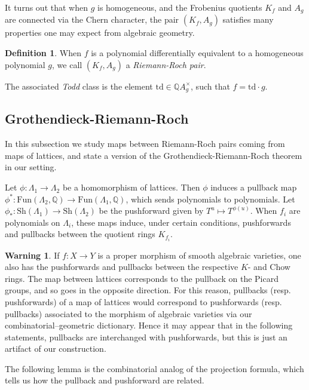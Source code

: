 \documentclass[oneside]{amsart}
\theoremstyle{plain}
\theoremstyle{definition}
\newtheorem{definition}[theorem]{Definition}
\newtheorem*{warning}{Warning}
\newcommand{\Q}{{\mathbb{Q}}}
\newcommand{\Fun}{{\mathrm{Fun}}}
\newcommand{\Sh}{{\mathrm{Sh}}}
\newcommand{\td}{{\mathrm{td}}}
\begin{document}
It turns out that when $g$ is homogeneous, and the Frobenius quotients $K_f$ and $A_g$ are connected via the Chern character, the pair $(K_f, A_g)$ satisfies many properties one may expect from algebraic geometry.

\begin{definition}
\label{def:RR-pair-std-graded}
    When $f$ is a polynomial differentially equivalent to a homogeneous polynomial $g$, we call $(K_f, A_g)$ a \emph{Riemann-Roch pair}.

    The associated \emph{Todd} class is the element $\td \in \Q A_g^\times$, such that $f = \td \cdot g$.
\end{definition}

\subsection{Grothendieck-Riemann-Roch}\label{sec:grr}

In this subsection we study maps between Riemann-Roch pairs coming from maps of lattices, and state a version of the Grothendieck-Riemann-Roch theorem in our setting.

Let $\phi\colon \Lambda_1\to \Lambda_2$ be a homomorphism of lattices. Then $\phi$ induces a pullback map
$\phi^*:\Fun(\Lambda_2, \Q) \to \Fun(\Lambda_1, \Q)$, which sends polynomials to polynomials.
Let $\phi_*: \Sh(\Lambda_1) \to \Sh(\Lambda_2)$ be the pushforward given by $T^u \mapsto T^{\phi(u)}$. 
When $f_i$ are polynomials on $\Lambda_i$, these maps induce, under certain conditions, pushforwards and pullbacks between the quotient rings $K_{f_i}$.

\begin{warning}
    If $f: X \to Y$ is a proper morphism of smooth algebraic varieties, one also has the pushforwards and pullbacks between the respective $K$- and Chow rings. The map between lattices corresponds to the pullback on the Picard groups, and so goes in the opposite direction. For this reason, pullbacks (resp. pushforwards) of a map of lattices would correspond to pushforwards (resp. pullbacks) associated to the morphism of algebraic varieties via our combinatorial--geometric dictionary. Hence it may appear that in the following statements, pullbacks are interchanged with pushforwards, but this is just an artifact of our construction.
\end{warning}

The following lemma is the combinatorial analog of the projection formula,
which tells us how the pullback and pushforward are related.
\end{document}
